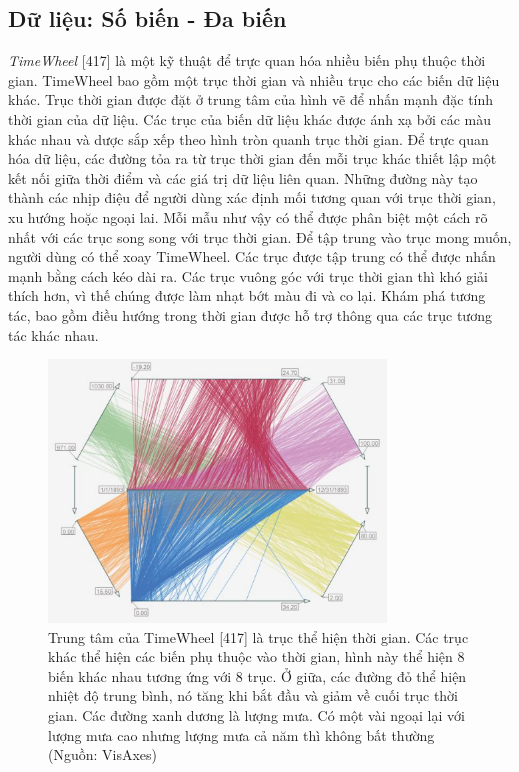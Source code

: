 \subsection{Dữ liệu: Số biến - Đa biến}
\textit{TimeWheel} [417] là một kỹ thuật để trực quan hóa nhiều biến phụ thuộc thời gian. TimeWheel bao gồm một trục thời gian và nhiều trục cho các biến dữ liệu khác. Trục thời gian được đặt ở trung tâm của hình vẽ để nhấn mạnh đặc tính thời gian của dữ liệu. Các trục của biến dữ liệu khác được ánh xạ bởi các màu khác nhau và dược sắp xếp theo hình tròn quanh trục thời gian. Để trực quan hóa dữ liệu, các đường tỏa ra từ trục thời gian đến mỗi trục khác thiết lập một kết nối giữa thời điểm và các giá trị dữ liệu liên quan. Những đường này tạo thành các nhịp điệu để người dùng xác định mối tương quan với trục thời gian, xu hướng hoặc ngoại lai. Mỗi mẫu như vậy có thể được phân biệt một cách rõ nhất với các trục song song với trục thời gian. Để tập trung vào trục mong muốn, người dùng có thể xoay TimeWheel. Các trục được tập trung có thể được nhấn mạnh bằng cách kéo dài ra. Các trục vuông góc với trục thời gian thì khó giải thích hơn, vì thế  chúng được làm nhạt bớt màu đi và co lại. Khám phá tương tác, bao gồm điều hướng trong thời gian được hỗ trợ thông qua các trục tương tác khác nhau.
\begin{figure}[H] %
    \centering %
    \includegraphics[width=0.8\textwidth]{assets/fig_7_7.png} 
    \caption{Trung tâm của TimeWheel [417] là trục thể hiện thời gian. Các trục khác thể hiện các biến phụ thuộc vào thời gian, hình này thể hiện 8 biến khác nhau tương ứng với 8 trục. Ở giữa, các đường đỏ thể hiện nhiệt độ trung bình, nó tăng khi bắt đầu và giảm về cuối trục thời gian. Các đường xanh dương là lượng mưa. Có một vài ngoại lại với lượng mưa cao nhưng lượng mưa cả năm thì không bất thường (Nguồn: VisAxes) } %
    \label{fig:f7.7}
\end{figure}